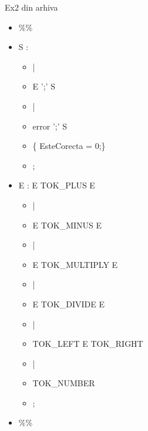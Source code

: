 \documentclass[pdf]{beamer}
\begin{document}
\begin{frame}{Ex2 din arhiva}
\begin{itemize}
	\item[]
	 \%\%
	
	\item[]
	S :

	\begin{itemize}
		\item[]
		\footnotesize |

		\item[]
		E ';' S
		
		\item[]
		\footnotesize |

		\item[]
		error ';' S
		
		\item[]
		\hspace{0.5cm}\{ EsteCorecta = 0;\}

		\item[]
		;

	\end{itemize}

	\item[]
	E : E TOK\_PLUS E

		\begin{itemize}
			\item[]
			      |

			\item[]
			E TOK\_MINUS E

			\item[]
			      \footnotesize |

			\item[]
			E TOK\_MULTIPLY E

			\item[]
			      \footnotesize |

			\item[]
			E TOK\_DIVIDE E

			\item[]
			       \footnotesize |

			\item[]
			TOK\_LEFT E TOK\_RIGHT

			\item[]
			      \footnotesize |

			\item[]
			TOK\_NUMBER

			\item[]
			      ;
		\end{itemize}

	\item[]
	\%\%

\end{itemize}
\end{frame}
\end{document}
